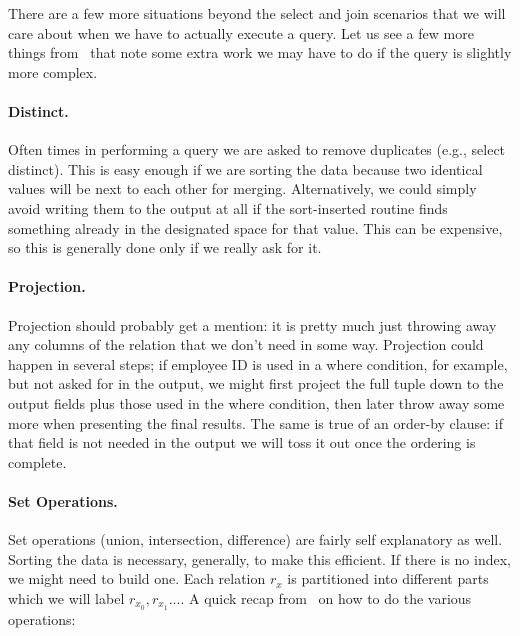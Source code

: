 There are a few more situations beyond the select and join scenarios that we will care about when we have to actually execute a query. Let us see a few more things from~\cite{dsc} that note some extra work we may have to do if the query is slightly more complex.

\paragraph{Distinct.} Often times in performing a query we are asked to remove duplicates (e.g., select distinct). This is easy enough if we are sorting the data because two identical values will be next to each other for merging. Alternatively, we could simply avoid writing them to the output at all if the sort-inserted routine finds something already in the designated space for that value. This can be expensive, so this is generally done only if we really ask for it.

\paragraph{Projection.} Projection should probably get a mention: it is pretty much just throwing away any columns of the relation that we don't need in some way. Projection could happen in several steps; if employee ID is used in a where condition, for example, but not asked for in the output, we might first project the full tuple down to the output fields plus those used in the where condition, then later throw away some more when presenting the final results. The same is true of an order-by clause: if that field is not needed in the output we will toss it out once the ordering is complete.

\paragraph{Set Operations.} Set operations (union, intersection, difference) are fairly self explanatory as well. Sorting the data is necessary, generally, to make this efficient. If there is no index, we might need to build one. Each relation $r_{x}$ is partitioned into different parts which we will label $r_{x_{0}}, r_{x_{1}}...$. A quick recap from~\cite{dsc} on how to do the various operations:

